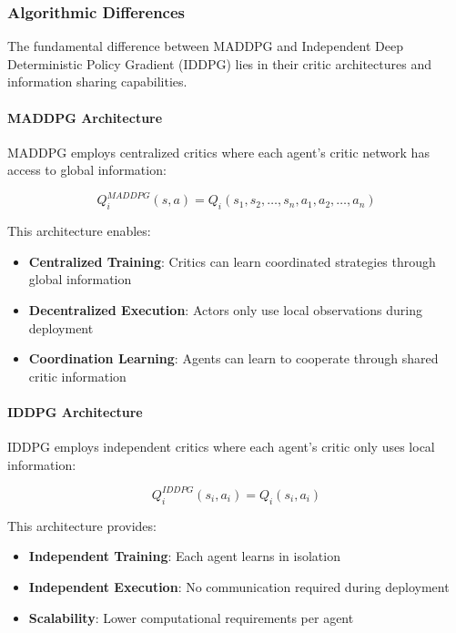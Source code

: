 \documentclass[conference]{IEEEtran}
\begin{document}
{{\subsubsection{Algorithmic Differences}

The fundamental difference between MADDPG and Independent Deep Deterministic Policy Gradient (IDDPG) lies in their critic architectures and information sharing capabilities.

\paragraph{MADDPG Architecture}

MADDPG employs centralized critics where each agent's critic network has access to global information:

\begin{equation}
Q_i^{MADDPG}(s, a) = Q_i(s_1, s_2, \ldots, s_n, a_1, a_2, \ldots, a_n)
\end{equation}

This architecture enables:
\begin{itemize}
    \item \textbf{Centralized Training}: Critics can learn coordinated strategies through global information
    \item \textbf{Decentralized Execution}: Actors only use local observations during deployment
    \item \textbf{Coordination Learning}: Agents can learn to cooperate through shared critic information
\end{itemize}

\paragraph{IDDPG Architecture}

IDDPG employs independent critics where each agent's critic only uses local information:

\begin{equation}
Q_i^{IDDPG}(s_i, a_i) = Q_i(s_i, a_i)
\end{equation}

This architecture provides:
\begin{itemize}
    \item \textbf{Independent Training}: Each agent learns in isolation
    \item \textbf{Independent Execution}: No communication required during deployment
    \item \textbf{Scalability}: Lower computational requirements per agent
\end{itemize}

}}
\end{document}
